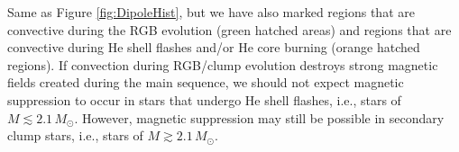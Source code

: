 \label{fig:DipoleHistConv}
Same as Figure \ref{fig:DipoleHist}, but we have also marked regions that are convective during the RGB evolution (green hatched areas) and regions that are convective during He shell flashes and/or He core burning (orange hatched regions). If convection during RGB/clump evolution destroys strong magnetic fields created during the main sequence, we should not expect magnetic suppression to occur in stars that undergo He shell flashes, i.e., stars of $M \lesssim 2.1 \, M_\odot$. However, magnetic suppression may still be possible in secondary clump stars, i.e., stars of $M \gtrsim 2.1 \, M_\odot$.